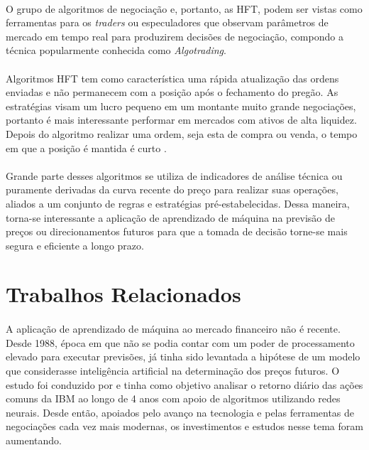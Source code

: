 \documentclass[grad,numbers]{coppe}
\begin{document}
        \paragraph{}O grupo de algoritmos de negociação e, portanto, as HFT, podem ser vistas como ferramentas para os \textit{traders} ou especuladores que observam parâmetros de mercado em tempo real para produzirem decisões de negociação, compondo a técnica popularmente conhecida como \textit{Algotrading}. 
        
        \paragraph{}Algoritmos HFT tem como característica uma rápida atualização das ordens enviadas e não permanecem com a posição após o fechamento do pregão. As estratégias visam um lucro pequeno em um montante muito grande negociações, portanto é mais interessante performar em mercados com ativos de alta liquidez. Depois do algoritmo realizar uma ordem, seja esta de compra ou venda, o tempo em que a posição é mantida é curto \cite{gomber-hft}.
        
        \paragraph{}Grande parte desses algoritmos se utiliza de indicadores de análise técnica ou puramente derivadas da curva recente do preço para realizar suas operações, aliados a um conjunto de regras e estratégias pré-estabelecidas. Dessa maneira, torna-se interessante a aplicação de aprendizado de máquina na previsão de preços ou direcionamentos futuros para que a tomada de decisão torne-se mais segura e eficiente a longo prazo.
        
    \section{Trabalhos Relacionados}
    
        \paragraph{}A aplicação de aprendizado de máquina ao mercado financeiro não é recente. Desde 1988, época em que não se podia contar com um poder de processamento elevado para executar previsões, já tinha sido levantada a hipótese de um modelo que considerasse inteligência artificial na determinação dos preços futuros. O estudo foi conduzido por \citet{halbert-white} e tinha como objetivo analisar o retorno diário das ações comuns da IBM ao longo de 4 anos com apoio de algoritmos utilizando redes neurais. Desde então, apoiados pelo avanço na tecnologia e pelas ferramentas de negociações cada vez mais modernas, os investimentos e estudos nesse tema foram aumentando.
        
\end{document}
